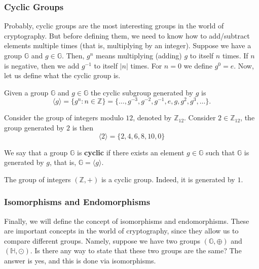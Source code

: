 \documentclass[../lecture-notes.tex]{subfiles}
\begin{document}
\subsubsection{Cyclic Groups}

Probably, cyclic groups are the most interesting groups in the world of cryptography. But before defining them, we need to know how to add/subtract elements multiple times (that is, multiplying by an integer). Suppose 
we have a group $\mathbb{G}$ and $g \in \mathbb{G}$. Then, $g^n$ means multiplying (adding) $g$ to itself $n$ times. If $n$ is negative, then we add $g^{-1}$ to itself $|n|$ times. For $n=0$ we define $g^0 = e$. Now, let us define what the cyclic group is.
\begin{definition}
    Given a group $\mathbb{G}$ and $g \in \mathbb{G}$ the cyclic subgroup generated by $g$ is
    \begin{equation}
        \langle g \rangle = \{g^n: n \in \mathbb{Z}\} = \{\dots,g^{-3}, g^{-2}, g^{-1}, e, g, g^2, g^3, \dots\}.
    \end{equation}
\end{definition}

\begin{example}
    Consider the group of integers modulo $12$, denoted by $\mathbb{Z}_{12}$. Consider $2 \in \mathbb{Z}_{12}$, the group generated by $2$ is then
    \begin{equation}
        \langle 2 \rangle = \{2,4,6,8,10, 0\}
    \end{equation}
\end{example}

\begin{definition}
    We say that a group $\mathbb{G}$ is \textbf{cyclic} if there exists an element $g \in \mathbb{G}$ such that $\mathbb{G}$ is generated by $g$, that is, $\mathbb{G} = \langle g \rangle$.
\end{definition}

\begin{example}
    The group of integers $(\mathbb{Z},+)$ is a cyclic group. Indeed, it is generated by $1$.
\end{example}

\subsubsection{Isomorphisms and Endomorphisms}

Finally, we will define the concept of isomorphisms and endomorphisms. These are important concepts in the world of cryptography, since they allow us to compare different groups. Namely, 
suppose we have two groups $(\mathbb{G},\oplus)$ and $(\mathbb{H}, \odot)$. Is there any way to state that these two groups are the same? The answer is yes, and this is done via isomorphisms.
\end{document}
